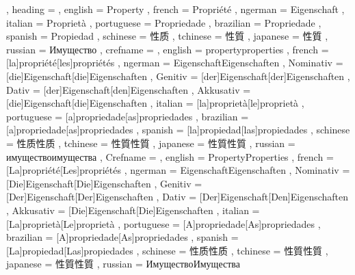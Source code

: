   {
    , heading =   {
                    , english     = Property
                    , french      = Propriété
                    , ngerman     = Eigenschaft
                    , italian     = Proprietà
                    , portuguese  = Propriedade
                    , brazilian   = Propriedade
                    , spanish     = Propiedad
                    , schinese    = 性质
                    , tchinese    = 性質
                    , japanese    = 性質
                    , russian     = Имущество
                  }
    , crefname =  {
                    , english     = {property}{properties}
                    , french      = [la]{propriété}[les]{propriétés}
                    , ngerman     = { {Eigenschaft}{Eigenschaften}
                                      , Nominativ = [die]{Eigenschaft}[die]{Eigenschaften}
                                      , Genitiv   = [der]{Eigenschaft}[der]{Eigenschaften}
                                      , Dativ     = [der]{Eigenschaft}[den]{Eigenschaften}
                                      , Akkusativ = [die]{Eigenschaft}[die]{Eigenschaften}
                                    }
                    , italian     = [la]{proprietà}[le]{proprietà}
                    , portuguese  = [a]{propriedade}[as]{propriedades}
                    , brazilian   = [a]{propriedade}[as]{propriedades}
                    , spanish     = [la]{propiedad}[las]{propiedades}
                    , schinese    = {性质}{性质}
                    , tchinese    = {性質}{性質}
                    , japanese    = {性質}{性質}
                    , russian     = {имущество}{имущества}
                  }
    , Crefname =  {
                    , english     = {Property}{Properties}
                    , french      = [La]{propriété}[Les]{propriétés}
                    , ngerman     = { {Eigenschaft}{Eigenschaften}
                                      , Nominativ = [Die]{Eigenschaft}[Die]{Eigenschaften}
                                      , Genitiv   = [Der]{Eigenschaft}[Der]{Eigenschaften}
                                      , Dativ     = [Der]{Eigenschaft}[Den]{Eigenschaften}
                                      , Akkusativ = [Die]{Eigenschaft}[Die]{Eigenschaften}
                                    }
                    , italian     = [La]{proprietà}[Le]{proprietà}
                    , portuguese  = [A]{propriedade}[As]{propriedades}
                    , brazilian   = [A]{propriedade}[As]{propriedades}
                    , spanish     = [La]{propiedad}[Las]{propiedades}
                    , schinese    = {性质}{性质}
                    , tchinese    = {性質}{性質}
                    , japanese    = {性質}{性質}
                    , russian     = {Имущество}{Имущества}
                  }
  }

